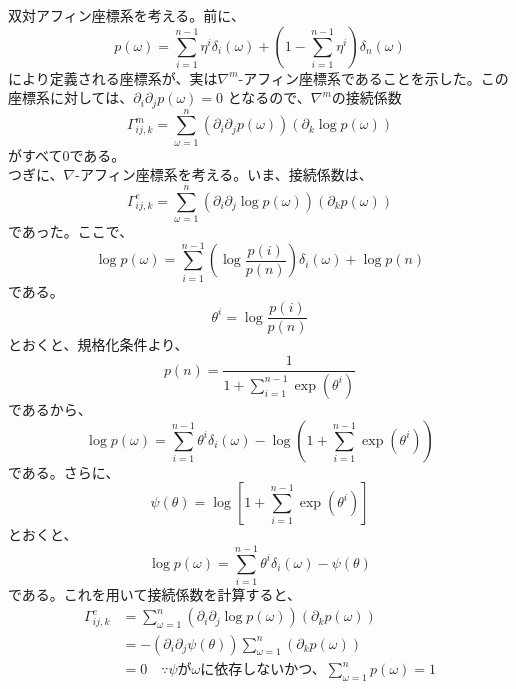 \documentclass[a4paper,11pt]{jsarticle}
\numberwithin{equation}{section}
\begin{document}
双対アフィン座標系を考える。前に、
\begin{equation}
    p(\omega) = \sum_{i=1}^{n-1} \eta^i \delta_i(\omega) + (1-\sum_{i=1}^{n-1} \eta^i) \delta_n(\omega)
\end{equation}
により定義される座標系が、実は$\nabla^{m}$-アフィン座標系であることを示した。この座標系に対しては、$\partial_i \partial_j p(\omega) = 0$
となるので、$\nabla^{m}$の接続係数
\begin{equation}
    \Gamma_{ij,k}^{m} = \sum_{\omega=1}^{n} (\partial_i \partial_j p(\omega)) (\partial_k \log p(\omega))
\end{equation}
がすべて0である。\\
つぎに、$\nabla$-アフィン座標系を考える。いま、接続係数は、
\begin{equation}
    \Gamma_{ij,k} ^{e} = \sum_{\omega=1}^{n} (\partial_i \partial_j \log p(\omega)) (\partial_k p(\omega))
\end{equation}
であった。ここで、
\begin{equation}
    \log p(\omega) = \sum_{i=1}^{n-1} \left(\log \frac{p(i)}{p(n)}\right) \delta_i(\omega) + \log p(n) 
\end{equation}
である。
\begin{equation}
\theta^i = \log \frac{p(i)}{p(n)}
\end{equation}
とおくと、規格化条件より、
\begin{equation}
    p(n) = \frac{1}{1+\sum_{i=1}^{n-1} \exp(\theta^i)} \label{eq:4}
\end{equation}
であるから、
\begin{equation}
    \log p(\omega) = \sum_{i=1}^{n-1} \theta^i \delta_i(\omega) - \log(1+\sum_{i=1}^{n-1} \exp(\theta^i))
\end{equation}
である。さらに、
\begin{equation}
    \psi(\theta) = \log \left[ 1+\sum_{i=1}^{n-1} \exp(\theta^i) \right]
\end{equation}
とおくと、
\begin{equation}
    \log p(\omega) = \sum_{i=1}^{n-1} \theta^i \delta_i(\omega) - \psi(\theta)
\end{equation}
である。これを用いて接続係数を計算すると、
\begin{align}
    \Gamma_{ij,k}^{e} &= \sum_{\omega=1}^{n} (\partial_i \partial_j \log p(\omega)) (\partial_k p(\omega))\\
    &= -(\partial_i \partial_j \psi(\theta)) \sum_{\omega=1}^{n} (\partial_k p(\omega))\\
    &= 0 \quad \because \text{$\psi$が$\omega$に依存しないかつ、$\sum_{\omega=1}^{n} p(\omega) = 1$}
\end{align}
\end{document}
